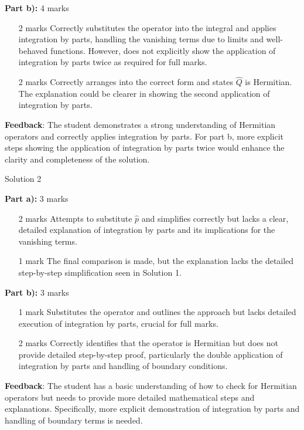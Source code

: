\documentclass[a4paper,11pt]{article}
\begin{document}
\textbf{Part b):} 4 marks
\begin{itemize}
    \item [2 marks] Correctly substitutes the operator into the integral and applies integration by parts, handling the vanishing terms due to limits and well-behaved functions. However, does not explicitly show the application of integration by parts twice as required for full marks.
    \item [2 marks] Correctly arranges into the correct form and states \(\hat{Q}\) is Hermitian. The explanation could be clearer in showing the second application of integration by parts.
\end{itemize}

\textbf{Feedback}: The student demonstrates a strong understanding of Hermitian operators and correctly applies integration by parts. For part b, more explicit steps showing the application of integration by parts twice would enhance the clarity and completeness of the solution.

Solution 2

\textbf{Part a):} 3 marks
\begin{itemize}
    \item [2 marks] Attempts to substitute \( \hat{p} \) and simplifies correctly but lacks a clear, detailed explanation of integration by parts and its implications for the vanishing terms.
    \item [1 mark] The final comparison is made, but the explanation lacks the detailed step-by-step simplification seen in Solution 1.
\end{itemize}

\textbf{Part b):} 3 marks
\begin{itemize}
    \item [1 mark] Substitutes the operator and outlines the approach but lacks detailed execution of integration by parts, crucial for full marks.
    \item [2 marks] Correctly identifies that the operator is Hermitian but does not provide detailed step-by-step proof, particularly the double application of integration by parts and handling of boundary conditions.
\end{itemize}

\textbf{Feedback}: The student has a basic understanding of how to check for Hermitian operators but needs to provide more detailed mathematical steps and explanations. Specifically, more explicit demonstration of integration by parts and handling of boundary terms is needed.
\end{document}
